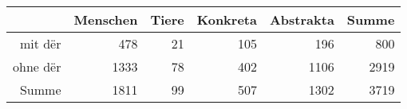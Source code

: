 \begin{tabular}{rrrrrr}
  \hline
 & Menschen & Tiere & Konkreta & Abstrakta & Summe \\ 
  \hline
mit dër & 478 & 21 & 105 & 196 & 800 \\ 
  ohne dër & 1333 & 78 & 402 & 1106 & 2919 \\ 
  Summe & 1811 & 99 & 507 & 1302 & 3719 \\ 
   \hline
\end{tabular}
